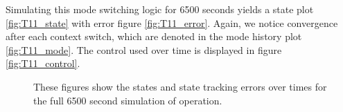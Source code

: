 \documentclass[paper]{aiaaNew}
\begin{document}
Simulating this mode switching logic for 6500 seconds yields a state plot \ref{fig:T11_state} with error figure \ref{fig:T11_error}. Again, we notice convergence after each context switch, which are denoted in the mode history plot \ref{fig:T11_mode}. The control used over time is displayed in figure \ref{fig:T11_control}.








\begin{figure}[!htbp] 
\centering     %
{}
\caption{These figures show the states and state tracking errors over times for the full 6500 second simulation of operation.}
\end{figure}
\end{document}
